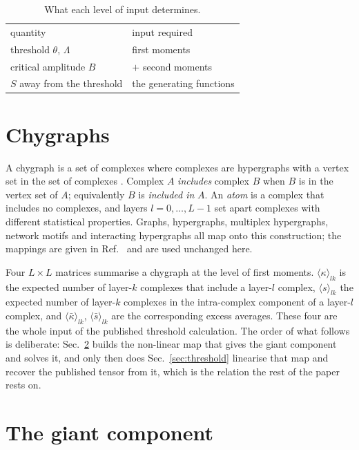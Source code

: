 \documentclass[aps,pre,twocolumn,superscriptaddress,floatfix,longbibliography]{revtex4-2}
\newcommand{\ave}[1]{\langle #1 \rangle}
\begin{document}
\begin{table}[b]
\caption{\label{tab:hierarchy}What each level of input determines.}
\begin{ruledtabular}
\begin{tabular}{ll}
quantity & input required \\
\colrule
threshold $\theta$, $\Lambda$ & first moments \\
critical amplitude $B$        & $+$ second moments \\
$S$ away from the threshold   & the generating functions \\
\end{tabular}
\end{ruledtabular}
\end{table}

\section{Chygraphs}\label{sec:chygraphs}

A chygraph is a set of complexes where complexes are hypergraphs with a vertex
set in the set of complexes \cite{vazquez2023pre}. Complex $A$ \emph{includes}
complex $B$ when $B$ is in the vertex set of $A$; equivalently $B$ is
\emph{included in} $A$. An \emph{atom} is a complex that includes no complexes,
and layers $l=0,\dots,L-1$ set apart complexes with different statistical
properties. Graphs, hypergraphs, multiplex hypergraphs, network motifs and
interacting hypergraphs all map onto this construction; the mappings are given
in Ref.~\cite{vazquez2024comnet} and are used unchanged here.

Four $L\times L$ matrices summarise a chygraph at the level of first moments.
$\ave{\kappa}_{lk}$ is the expected number of layer-$k$ complexes that include a
layer-$l$ complex, $\ave{s}_{lk}$ the expected number of layer-$k$ complexes in
the intra-complex component of a layer-$l$ complex, and
$\ave{\bar\kappa}_{lk}$, $\ave{\bar s}_{lk}$ are the corresponding excess
averages. These four are the whole input of the published threshold calculation.
The order of what follows is deliberate: Sec.~\ref{sec:map} builds the
non-linear map that gives the giant component and solves it, and only then does
Sec.~\ref{sec:threshold} linearise that map and recover the published tensor
from it, which is the relation the rest of the paper rests on.

\section{The giant component}\label{sec:map}
\end{document}

